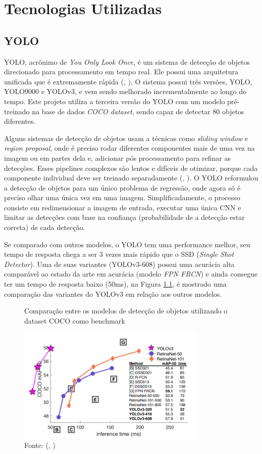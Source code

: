 \documentclass[]{politex}
\begin{document}
\chapter{Tecnologias Utilizadas}
\section{YOLO} \label{yolo}
YOLO, acrônimo de \textit{You Only Look Once}, é um sistema de detecção de objetos direcionado para processamento em tempo real. Ele possui uma arquitetura unificada que é extremamente rápida (, \citeyear{yolov1}). O sistema possui três versões, YOLO, YOLO9000 e YOLOv3, e vem sendo melhorado incrementalmente ao longo do tempo. Este projeto utiliza a terceira versão do YOLO com um modelo pré-treinado na base de dados \textit{COCO dataset}, sendo capaz de detectar 80 objetos diferentes.

Alguns sistemas de detecção de objetos usam a técnicas como \textit{sliding window} e \textit{region proposal}, onde é preciso rodar diferentes componentes mais de uma vez na imagem ou em partes dela e, adicionar pós processamento para refinar as detecções. Esses pipelines complexos são lentos e difíceis de otimizar, porque cada componente individual deve ser treinado separadamente (, \citeyear{yolov1}). O YOLO reformulou a detecção de objetos para um único problema de regressão, onde agora só é preciso olhar uma única vez em uma imagem. Simplificadamente, o processo consiste em redimensionar a imagem de entrada, executar uma única CNN e limitar as detecções com base na confiança (probabilidade de a detecção estar correta) de cada detecção.

Se comparado com outros modelos, o YOLO tem uma performance melhor, seu tempo de resposta chega a ser 3 vezes mais rápido que o SSD (\textit{Single Shot Detector}). Uma de suas variantes (YOLOv3-608) possui uma acurácia alta comparável ao estado da arte em acurácia (modelo \textit{FPN FRCN}) e ainda consegue ter um tempo de resposta baixo (50ms), na Figura \ref{fig:yolo_comparacao}, é mostrado uma comparação das variantes do YOLOv3 em relação aos outros modelos.

\begin{figure}[H]
    \centering
    \caption{Comparação entre os modelos de detecção de objetos utilizando o dataset COCO como benchmark}
    \includegraphics[width=0.8\textwidth]{yolov3_comparacao}
    \caption*{Fonte: (, \citeyear{yolov3})}
    \label{fig:yolo_comparacao}
\end{figure}
\end{document}
